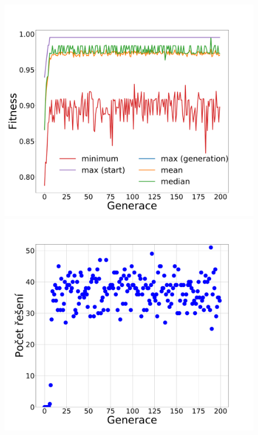 \documentclass[11pt]{article}
\begin{document}
\begin{landscape}
\begin{figure}
    \begin{minipage}[c]{0.35\textwidth}
        \centering \includegraphics[width=\textwidth]{img/m051g.pdf} 
    \end{minipage}
    \begin{minipage}[c]{0.35\textwidth}
        \centering \includegraphics[width=\textwidth]{img/m051s.pdf} 
    \end{minipage}
    \\
    \begin{minipage}[c]{0.35\textwidth}

\end{minipage}
\end{figure}
\end{landscape}
\end{document}
